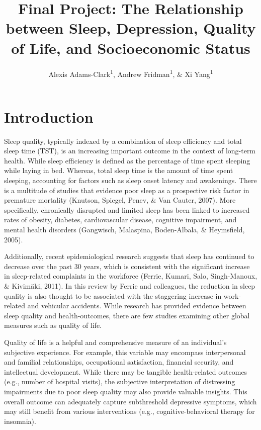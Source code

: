 \documentclass[man, noextraspace]{apa6}
\title{Final Project: The Relationship between Sleep, Depression, Quality of
Life, and Socioeconomic Status}
\author{Alexis Adams-Clark\textsuperscript{1}, Andrew
Fridman\textsuperscript{1}, \& Xi Yang\textsuperscript{1}}
\date{}
\affiliation{
\vspace{0.5cm}
\textsuperscript{1} University of Oregon Department of Psychology}
\theoremstyle{definition}
\theoremstyle{definition}
\theoremstyle{definition}
\theoremstyle{remark}
\begin{document}
\maketitle

\section{Introduction}\label{introduction}

Sleep quality, typically indexed by a combination of sleep efficiency
and total sleep time (TST), is an increasing important outcome in the
context of long-term health. While sleep efficiency is defined as the
percentage of time spent sleeping while laying in bed. Whereas, total
sleep time is the amount of time spent sleeping, accounting for factors
such as sleep onset latency and awakenings. There is a multitude of
studies that evidence poor sleep as a prospective risk factor in
premature mortality (Knutson, Spiegel, Penev, \& Van Cauter, 2007). More
specifically, chronically disrupted and limited sleep has been linked to
increased rates of obesity, diabetes, cardiovascular disease, cognitive
impairment, and mental health disorders (Gangwisch, Malaspina,
Boden-Albala, \& Heymsfield, 2005).

Additionally, recent epidemiological research suggests that sleep has
continued to decrease over the past 30 years, which is consistent with
the significant increase in sleep-related complaints in the workforce
(Ferrie, Kumari, Salo, Singh-Manoux, \& Kivimäki, 2011). In this review
by Ferrie and colleagues, the reduction in sleep quality is also thought
to be associated with the staggering increase in work-related and
vehicular accidents. While research has provided evidence between sleep
quality and health-outcomes, there are few studies examining other
global measures such as quality of life.

Quality of life is a helpful and comprehensive measure of an
individual's subjective experience. For example, this variable may
encompass interpersonal and familial relationships, occupational
satisfaction, financial security, and intellectual development. While
there may be tangible health-related outcomes (e.g., number of hospital
visits), the subjective interpretation of distressing impairments due to
poor sleep quality may also provide valuable insights. This overall
outcome can adequately capture subthreshold depressive symptoms, which
may still benefit from various interventions (e.g., cognitive-behavioral
therapy for insomnia).
\end{document}
